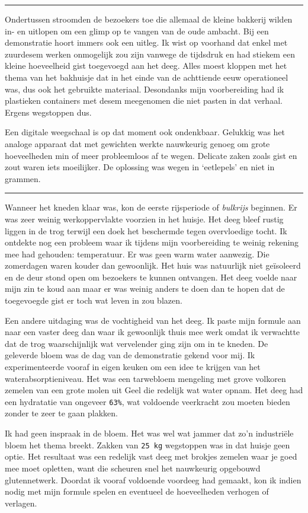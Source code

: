 \documentclass[
  11pt,
  dutch,
]{memoir}
\begin{document}
\pfbreak

Ondertussen stroomden de bezoekers toe die allemaal de kleine bakkerij
wilden in- en uitlopen om een glimp op te vangen van de oude ambacht.
Bij een demonstratie hoort immers ook een uitleg. Ik wist op voorhand
dat enkel met zuurdesem werken onmogelijk zou zijn vanwege de tijdsdruk
en had stiekem een kleine hoeveelheid gist toegevoegd aan het deeg.
Alles moest kloppen met het thema van het bakhuisje dat in het einde van
de achttiende eeuw operationeel was, dus ook het gebruikte materiaal.
Desondanks mijn voorbereiding had ik plastieken containers met desem
meegenomen die niet pasten in dat verhaal. Ergens wegstoppen dus.

Een digitale weegschaal is op dat moment ook ondenkbaar. Gelukkig was
het analoge apparaat dat met gewichten werkte nauwkeurig genoeg om grote
hoeveelheden min of meer probleemloos af te wegen. Delicate zaken zoals
gist en zout waren iets moeilijker. De oplossing was wegen in
`eetlepels' en niet in grammen.

\pfbreak

Wanneer het kneden klaar was, kon de eerste rijsperiode of
\emph{bulkrijs} beginnen. Er was zeer weinig werkoppervlakte voorzien in
het huisje. Het deeg bleef rustig liggen in de trog terwijl een doek het
beschermde tegen overvloedige tocht. Ik ontdekte nog een probleem waar
ik tijdens mijn voorbereiding te weinig rekening mee had gehouden:
temperatuur. Er was geen warm water aanwezig. Die zomerdagen waren
kouder dan gewoonlijk. Het huis was natuurlijk niet geïsoleerd en de
deur stond open om bezoekers te kunnen ontvangen. Het deeg voelde naar
mijn zin te koud aan maar er was weinig anders te doen dan te hopen dat
de toegevoegde gist er toch wat leven in zou blazen.

Een andere uitdaging was de vochtigheid van het deeg. Ik paste mijn
formule aan naar een vaster deeg dan waar ik gewoonlijk thuis mee werk
omdat ik verwachtte dat de trog waarschijnlijk wat vervelender ging zijn
om in te kneden. De geleverde bloem was de dag van de demonstratie
gekend voor mij. Ik experimenteerde vooraf in eigen keuken om een idee
te krijgen van het waterabsorptieniveau. Het was een tarwebloem
mengeling met grove volkoren zemelen van een grote molen uit Geel die
redelijk wat water opnam. Het deeg had een hydratatie van ongeveer
\texttt{63\%}, wat voldoende veerkracht zou moeten bieden zonder te zeer
te gaan plakken.

Ik had geen inspraak in de bloem. Het was wel wat jammer dat zo'n
industriële bloem het thema breekt. Zakken van \texttt{25\ kg}
wegstoppen was in dat huisje geen optie. Het resultaat was een redelijk
vast deeg met brokjes zemelen waar je goed mee moet opletten, want die
scheuren snel het nauwkeurig opgebouwd glutennetwerk. Doordat ik vooraf
voldoende voordeeg had gemaakt, kon ik indien nodig met mijn formule
spelen en eventueel de hoeveelheden verhogen of verlagen.
\end{document}
